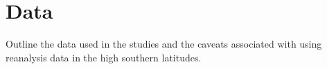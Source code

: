 \section{Data}\label{s:data}

Outline the data used in the studies and the caveats associated with using reanalysis data in the high southern latitudes.